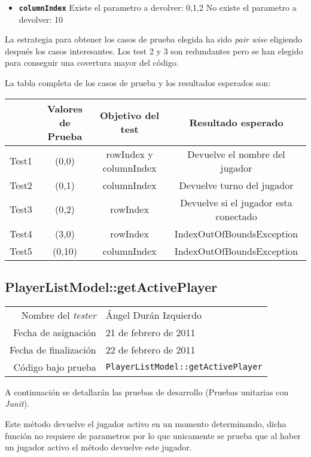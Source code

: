 \begin{itemize}
\item \textbf{\texttt{columnIndex}}
\subitem Existe el parametro a devolver: 0,1,2
\subitem No existe el parametro a devolver: 10
\end{itemize}

La estrategia para obtener los casos de prueba elegida ha sido
\textit{pair wise} eligiendo despu\'es los casos interesantes. Los test 2 y 3 son redundantes pero se han elegido
para conseguir una covertura mayor del c\'odigo.

La tabla completa de los casos de prueba y los resultados esperados son:

{\footnotesize
\begin{longtable}[c]{lccc}
 & \textbf{Valores de Prueba} & \textbf{Objetivo del test} & \textbf{Resultado esperado} \\
\hline \hline
\endhead

Test1 & (0,0) & rowIndex y columnIndex & Devuelve el nombre del jugador\\
Test2 & (0,1) & columnIndex & Devuelve turno del jugador\\
Test3 & (0,2) & rowIndex & Devuelve si el jugador esta conectado\\
Test4 & (3,0) & rowIndex  & IndexOutOfBoundsException\\
Test5 & (0,10) & columnIndex & IndexOutOfBoundsException\\

\hline
\end{longtable}
}

\subsection{PlayerListModel::getActivePlayer}

{\small
\begin{tabular}{r|l}
Nombre del \textit{tester} & \'Angel Dur\'an Izquierdo\\
Fecha de asignación & 21 de febrero de 2011 \\
Fecha de finalización & 22 de febrero de 2011 \\
Código bajo prueba & \texttt{PlayerListModel::getActivePlayer}
\end{tabular}
}

A continuación se detallarán las pruebas de desarrollo (Pruebas unitarias con \textit{Junit}).

Este m\'etodo devuelve el jugador activo en un momento determinando, dicha funci\'on no requiere de parametros por lo que unicamente se prueba que al haber un jugador activo el m\'etodo devuelve este jugador.

